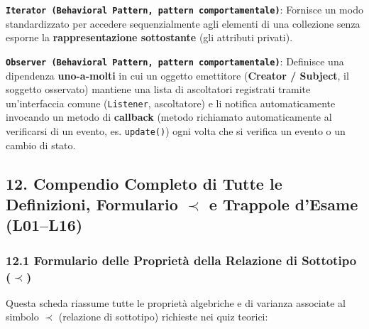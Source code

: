 \textbf{\texttt{Iterator (Behavioral Pattern, pattern comportamentale)}}: Fornisce un modo standardizzato per accedere sequenzialmente agli elementi di una collezione senza esporne la \textbf{rappresentazione sottostante} (gli attributi privati).

\textbf{\texttt{Observer (Behavioral Pattern, pattern comportamentale)}}: Definisce una dipendenza \textbf{uno-a-molti} in cui un oggetto emettitore (\textbf{Creator / Subject}, il soggetto osservato) mantiene una lista di ascoltatori registrati tramite un'interfaccia comune (\texttt{Listener}, ascoltatore) e li notifica automaticamente invocando un metodo di \textbf{callback} (metodo richiamato automaticamente al verificarsi di un evento, es. \texttt{update()}) ogni volta che si verifica un evento o un cambio di stato.

\subsection{12. Compendio Completo di Tutte le Definizioni, Formulario \texorpdfstring{$\prec$}{sottotipo} e Trappole d'Esame (L01–L16)}\label{12-compendio-completo-di-tutte-le-definizioni-formulario-prec-e-trappole-d-esame-l01-l16}

\subsubsection{12.1 Formulario delle Proprietà della Relazione di Sottotipo \texorpdfstring{($\prec$)}{(sottotipo)}}\label{12-1-formulario-delle-proprieta-della-relazione-di-sottotipo-prec}

Questa scheda riassume tutte le proprietà algebriche e di varianza associate al simbolo $\prec$ (relazione di sottotipo) richieste nei quiz teorici:

